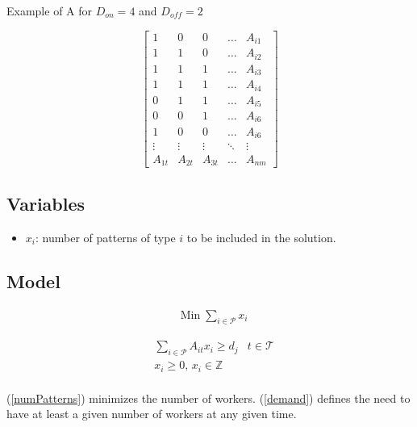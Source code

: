 \documentclass[a4paper,11pt]{article}
\begin{document}
    \vskip 0.3cm

    Example of A for $D_{on}=4$ and $D_{off}=2$

    $$
    \begin{bmatrix}
        1 & 0 & 0 & \dots  & A_{i1} \\
        1 & 1 & 0 & \dots  & A_{i2} \\
        1 & 1 & 1 & \dots  & A_{i3} \\
        1 & 1 & 1 & \dots  & A_{i4} \\
        0 & 1 & 1 & \dots  & A_{i5} \\
        0 & 0 & 1 & \dots  & A_{i6} \\
        1 & 0 & 0 & \dots  & A_{i6} \\
        \vdots & \vdots & \vdots & \ddots & \vdots \\
        A_{1t} & A_{2t} & A_{3t} & \dots  & A_{nm}
    \end{bmatrix}
    $$

    \subsection{Variables}

    \begin{itemize}
     \item $x_i$: number of patterns of type $i$ to be included in the solution.
    \end{itemize}

    \subsection{Model}

    \begin{align}
        & \text{Min}\; \sum_{i \in \mathcal{P}} x_i \label{numPatterns}
    \end{align}

    \begin{align}
        & \sum_{i \in \mathcal{P}} A_{it}x_{i} \geq d_j & t \in \mathcal{T} \label{demand} \\
        & x_{i} \geq 0,\, x_{i} \in \mathbb{Z} \\
    \end{align}

    (\ref{numPatterns}) minimizes the number of workers. (\ref{demand}) defines the need to have at least a given number of workers at any given time.  

\clearpage
\end{document}
